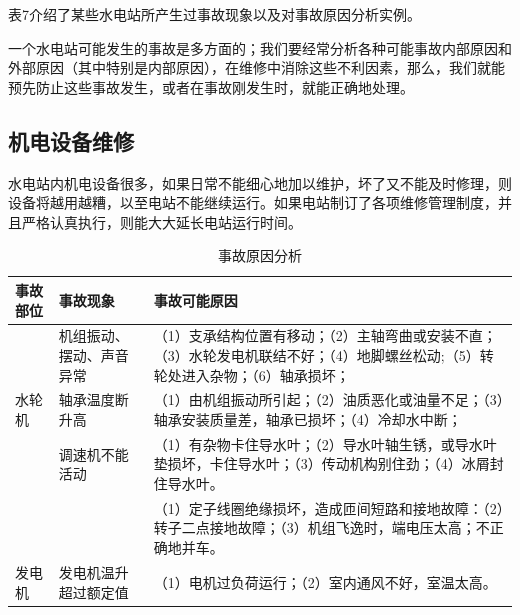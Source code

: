 \documentclass{ctexbook}
\begin{document}
表7介绍了某些水电站所产生过事故现象以及对事故原因分析实例。

一个水电站可能发生的事故是多方面的；我们要经常分析各种可能事故内部原因和外部原因（其中特别是内部原因），在维修中消除这些不利因素，那么，我们就能预先防止这些事故发生，或者在事故刚发生时，就能正确地处理。

\subsection{机电设备维修}

水电站内机电设备很多，如果日常不能细心地加以维护，坏了又不能及时修理，则设备将越用越糟，以至电站不能继续运行。如果电站制订了各项维修管理制度，并且严格认真执行，则能大大延长电站运行时间。

\begin{table}[htbp]
	\centering
	\caption{事故原因分析}
	\begin{tabular}{l|l|p{80em}}
		\hline
		事故部位&事故现象& \multicolumn{1}{l}{事故可能原因}\\ \hline
		&机组振动、摆动、声音异常 &（1）支承结构位置有移动；\newline{}（2）主轴弯曲或安装不直；\newline{}（3）水轮发电机联结不好；\newline{}（4）地脚螺丝松动;\newline{}（5）转轮处进入杂物；\newline{}（6）轴承损坏；\\ \hline
		水轮机&轴承温度断升高&（1）由机组振动所引起；\newline{}（2）油质恶化或油量不足；\newline{}（3）轴承安装质量差，轴承已损坏；\newline{}（4）冷却水中断；\\ \hline
		&调速机不能活动&（1）有杂物卡住导水叶；\newline{}（2）导水叶轴生锈，或导水叶垫损坏，卡住导水叶；\newline{}（3）传动机构别住劲；\newline{}（4）冰屑封住导水叶。\\ \hline
		& &（1）定子线圈绝缘损坏，造成匝间短路和接地故障：\newline{}（2）转子二点接地故障；\newline{}（3）机组飞逸时，端电压太高；不正确地并车。\\ \hline
		发电机&发电机温升超过额定值&（1）电机过负荷运行；\newline{}（2）室内通风不好，室温太高。\\ \hline

\end{tabular}
\end{table}
\end{document}
